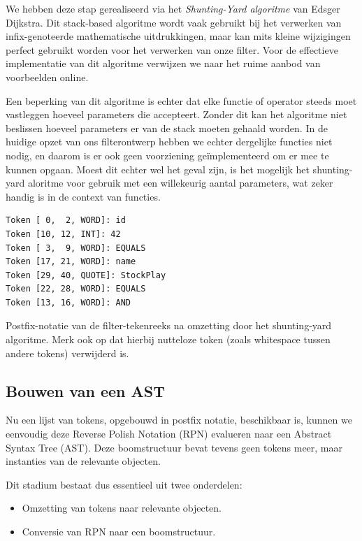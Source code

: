 We hebben deze stap gerealiseerd via het \emph{Shunting-Yard algoritme} van Edsger Dijkstra. Dit stack-based algoritme wordt vaak gebruikt bij het verwerken van infix-genoteerde mathematische uitdrukkingen, maar kan mits kleine wijzigingen perfect gebruikt worden voor het verwerken van onze filter. Voor de effectieve implementatie van dit algoritme verwijzen we naar het ruime aanbod van voorbeelden online.

Een beperking van dit algoritme is echter dat elke functie of operator steeds moet vastleggen hoeveel parameters die accepteert. Zonder dit kan het algoritme niet beslissen hoeveel parameters er van de stack moeten gehaald worden. In de huidige opzet van ons filterontwerp hebben we echter dergelijke functies niet nodig, en daarom is er ook geen voorziening ge\"implementeerd om er mee te kunnen opgaan. Moest dit echter wel het geval zijn, is het mogelijk het shunting-yard aloritme  voor gebruik met een willekeurig aantal parameters, wat zeker handig is in de context van functies.

\begin{code}
\begin{verbatim}
Token [ 0,  2, WORD]: id
Token [10, 12, INT]: 42
Token [ 3,  9, WORD]: EQUALS
Token [17, 21, WORD]: name
Token [29, 40, QUOTE]: StockPlay
Token [22, 28, WORD]: EQUALS
Token [13, 16, WORD]: AND
\end{verbatim}
\caption{Postfix-notatie van de filter-tekenreeks na omzetting door het shunting-yard algoritme. Merk ook op dat hierbij nutteloze token (zoals whitespace tussen andere tokens) verwijderd is.}
\end{code}

\subsection{Bouwen van een AST}

Nu een lijst van tokens, opgebouwd in postfix notatie, beschikbaar is, kunnen we eenvoudig deze Reverse Polish Notation (RPN) evalueren naar een Abstract Syntax Tree (AST). Deze boomstructuur bevat tevens geen tokens meer, maar instanties van de relevante objecten.

Dit stadium bestaat dus essentieel uit twee onderdelen:
\begin{itemize}
\item Omzetting van tokens naar relevante objecten.
\item Conversie van RPN naar een boomstructuur.
\end{itemize}

